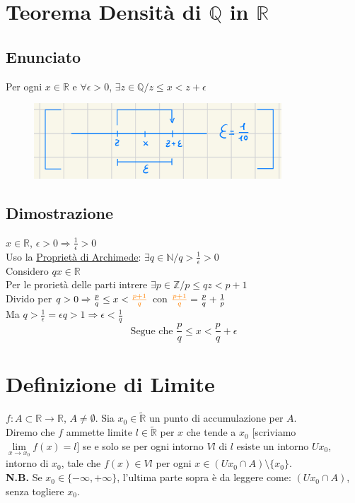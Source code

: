 \documentclass{article}
\newcommand{\R}{\mathbb{R}}
\newcommand{\N}{\mathbb{N}}
\newcommand{\Q}{\mathbb{Q}}
\newcommand{\Z}{\mathbb{Z}}
\newcommand{\Rext}{\widetilde{\mathbb{R}}}
\newcommand{\vSpace}{\vspace{1em}}
\begin{document}
\begin{flushleft}
\newpage
\section{Teorema Densità di $\Q$ in $\R$}
\subsection{Enunciato}
Per ogni $x \in \R$ e $\forall \epsilon > 0 $, $\exists z \in \Q / z \leq x < z + \epsilon$ 
\begin{figure}[h]
    \centering
    \includegraphics[width=25em]{./images/densityQinR.jpeg}
\end{figure}
\FloatBarrier

\subsection{Dimostrazione}
$x \in \R$, $\epsilon > 0 \Rightarrow \frac{1}{\epsilon}> 0$\\
Uso la \hyperref[Archimede]{Proprietà di Archimede}: $\exists q \in \N / q > \frac{1}{\epsilon} > 0$\\
Considero $qx \in \R$\\
Per le prorietà delle parti intrere $\exists p \in \Z / p \leq qz < p + 1$\\
Divido per $q > 0 \Rightarrow \frac{p}{q} \leq x < \textcolor{orange}{\frac{p + 1}{q}}$ \hspace*{1em} con
$\textcolor{orange}{\frac{p + 1}{q}} = \frac{p}{q} + \frac{1}{p}$\\
Ma $q > \frac{1}{\epsilon} = \epsilon q > 1 \Rightarrow \epsilon < \frac{1}{q}$\\
\[ \text{Segue che }\frac{p}{q}\leq x < \frac{p}{q} + \epsilon\]

\section{Definizione di Limite}
$f:A \subset \R \rightarrow \R$, $A \neq \emptyset$. Sia $x_0 \in \Rext$ un punto di accumulazione per $A$.\\
Diremo che $f$ ammette limite $l \in \Rext$ per $x$ che tende a $x_0$ [scriviamo $\lim\limits_{x \to x_0}f(x) = l$] se e solo se per ogni
intorno $Vl$ di $l$ esiste un intorno $Ux_0$, intorno di $x_0$, tale che $f(x) \in Vl$ per ogni $x \in (Ux_0 \cap A) \setminus \{x_0\}$.\\
\vSpace
\textbf{N.B.} Se $x_0 \in \{- \infty, + \infty\}$, l'ultima parte sopra è da leggere come: $(Ux_0 \cap A)$, senza togliere $x_0$.


\end{flushleft}
\end{document}
